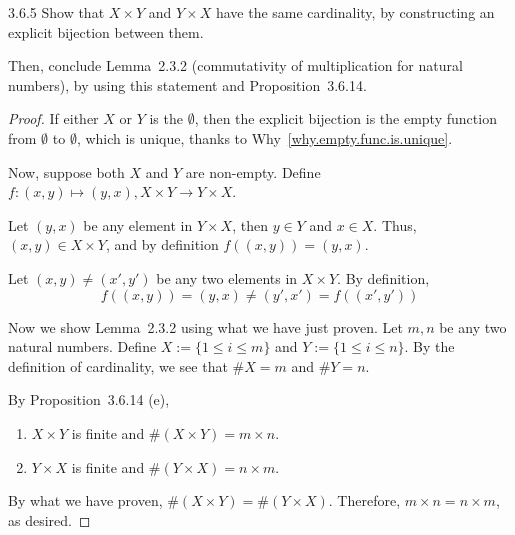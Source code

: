\begin{exercise}{3.6.5}
	Show that $X \times Y$ and $Y \times X$ have the same cardinality, by constructing an explicit bijection between them.
	
	Then, conclude Lemma~2.3.2 (commutativity of multiplication for natural numbers), by using this statement and Proposition~3.6.14.
\end{exercise}
\begin{proof}
If either $X$ or $Y$ is the $\emptyset$, then the explicit bijection is the empty function from $\emptyset$ to $\emptyset$, which is unique, thanks to Why~\ref{why.empty.func.is.unique}. 

Now, suppose both $X$ and $Y$ are non-empty. Define $f: (x,y) \mapsto (y,x), X\times Y \rightarrow Y \times X$. 

 Let $(y,x)$ be any element in $Y \times X$, then $y \in Y$ and $x \in X$. Thus, $(x,y) \in X \times Y$, and by definition $f((x,y)) = (y,x)$.

 Let $(x,y) \ne (x',y')$ be any two elements in $X \times Y$. By definition, 
\[
	f((x,y)) = (y,x) \ne (y',x') = f((x',y'))
\]

Now we show Lemma~2.3.2 using what we have just proven. Let $m,n$ be any two natural numbers. Define $X := \{1 \le i \le m\}$ and $Y := \{1 \le i \le n\}$. By the definition of cardinality, we see that $\#X = m$ and $\#Y = n$.

By Proposition~3.6.14 (e), 
\begin{enumerate}
	\item $X \times Y$ is finite and $\#(X \times Y) = m \times n$.
	\item $Y \times X$ is finite and $\#(Y \times X) = n \times m$.
\end{enumerate}

By what we have proven, $\#(X \times Y) = \#(Y \times X)$. Therefore, $m \times n = n \times m$, as desired.
\end{proof}

